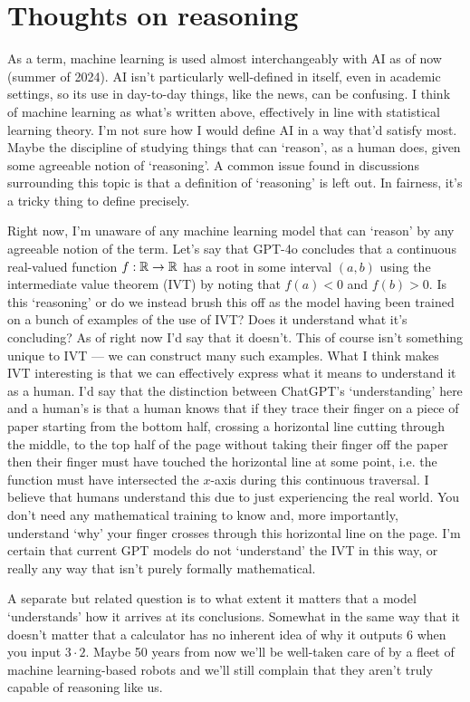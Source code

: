 \documentclass[11pt]{article}
\begin{document}
\section*{Thoughts on reasoning}

As a term, machine learning is used almost interchangeably with AI as of now (summer of 2024). AI isn't particularly well-defined in itself, even in academic settings, so its use in day-to-day things, like the news, can be confusing. I think of machine learning as what's written above, effectively in line with statistical learning theory. I'm not sure how I would define AI in a way that'd satisfy most. Maybe the discipline of studying things that can `reason', as a human does, given some agreeable notion of `reasoning'. A common issue found in discussions surrounding this topic is that a definition of `reasoning' is left out. In fairness, it's a tricky thing to define precisely.

Right now, I'm unaware of any machine learning model that can `reason' by any agreeable notion of the term. Let's say that GPT-4o concludes that a continuous real-valued function $f:\mathbb{R}\rightarrow\mathbb{R}$ has a root in some interval $(a, b)$ using the intermediate value theorem (IVT) by noting that $f(a)<0$ and $f(b)>0$. Is this `reasoning' or do we instead brush this off as the model having been trained on a bunch of examples of the use of IVT? Does it understand what it's concluding? As of right now I'd say that it doesn't. This of course isn't something unique to IVT — we can construct many such examples. What I think makes IVT interesting is that we can effectively express what it means to understand it as a human. I'd say that the distinction between ChatGPT's `understanding' here and a human's is that a human knows that if they trace their finger on a piece of paper starting from the bottom half, crossing a horizontal line cutting through the middle, to the top half of the page without taking their finger off the paper then their finger must have touched the horizontal line at some point, i.e. the function must have intersected the $x$-axis during this continuous traversal. I believe that humans understand this due to just experiencing the real world. You don't need any mathematical training to know and, more importantly, understand `why' your finger crosses through this horizontal line on the page. I'm certain that current GPT models do not `understand' the IVT in this way, or really any way that isn't purely formally mathematical.

A separate but related question is to what extent it matters that a model `understands' how it arrives at its conclusions. Somewhat in the same way that it doesn't matter that a calculator has no inherent idea of why it outputs 6 when you input $3\cdot2$. Maybe 50 years from now we'll be well-taken care of by a fleet of machine learning-based robots and we'll still complain that they aren't truly capable of reasoning like us.
\end{document}
